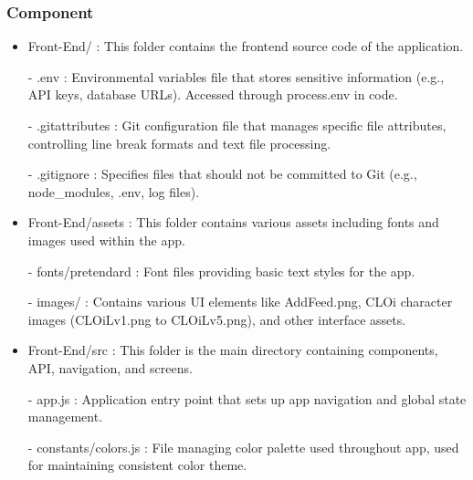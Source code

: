\documentclass[conference]{IEEEtran}
\begin{document}
            \subsubsection{Component}
                \begin{itemize}
                    \item Front-End/ : This folder contains the frontend source code of the application.
                        \item[-] .env : Environmental variables file that stores sensitive information (e.g., API keys, database URLs). Accessed through process.env in code.
                        \item[-] .gitattributes : Git configuration file that manages specific file attributes, controlling line break formats and text file processing.
                        \item[-] .gitignore : Specifies files that should not be committed to Git (e.g., node_modules, .env, log files).
                    \vspace{3mm}
                    
                    \item Front-End/assets : This folder contains various assets including fonts and images used within the app.
                        \item[-] fonts/pretendard : Font files providing basic text styles for the app.
                        \item[-] images/ : Contains various UI elements like AddFeed.png, CLOi character images (CLOiLv1.png to CLOiLv5.png), and other interface assets.
                    \vspace{3mm}
                    
                    \item Front-End/src : This folder is the main directory containing components, API, navigation, and screens.
                        \item[-] app.js : Application entry point that sets up app navigation and global state management.
                        \item[-] constants/colors.js : File managing color palette used throughout app, used for maintaining consistent color theme.
                    \vspace{3mm}
                    

\end{itemize}
\end{document}
